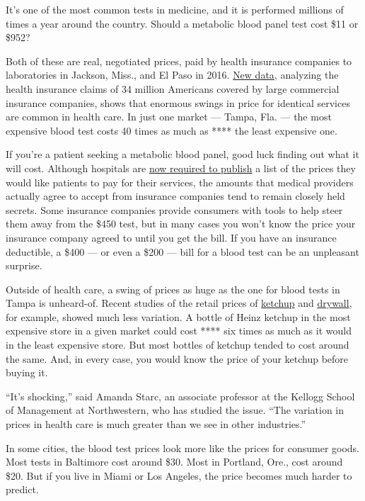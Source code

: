It's one of the most common tests in medicine, and it is performed
millions of times a year around the country. Should a metabolic blood
panel test cost \$11 or \$952?

Both of these are real, negotiated prices, paid by health insurance
companies to laboratories in Jackson, Miss., and El Paso in 2016.
\href{https://www.healthcostinstitute.org/blog/entry/hmi-2019-service-prices}{New
data}, analyzing the health insurance claims of 34 million Americans
covered by large commercial insurance companies, shows that enormous
swings in price for identical services are common in health care. In
just one market --- Tampa, Fla. --- the most expensive blood test costs
40 times as much as **** the least expensive one.

If you're a patient seeking a metabolic blood panel, good luck finding
out what it will cost. Although hospitals are
\href{https://www.nytimes3xbfgragh.onion/2019/01/13/us/politics/hospital-prices-online.html}{now
required to publish} a list of the prices they would like patients to
pay for their services, the amounts that medical providers actually
agree to accept from insurance companies tend to remain closely held
secrets. Some insurance companies provide consumers with tools to help
steer them away from the \$450 test, but in many cases you won't know
the price your insurance company agreed to until you get the bill. If
you have an insurance deductible, a \$400 --- or even a \$200 --- bill
for a blood test can be an unpleasant surprise.

Outside of health care, a swing of prices as huge as the one for blood
tests in Tampa is unheard-of. Recent studies of the retail prices of
\href{https://www.semanticscholar.org/paper/THE-MORPHOLOGY-OF-PRICE-DISPERSION-Kaplan/fe959cc8917c4843ef926a5c1fd5e480317a588e}{ketchup}
and
\href{https://pubs.aeaweb.org/doi/pdfplus/10.1257/mic.20170130}{drywall},
for example, showed much less variation. A bottle of Heinz ketchup in
the most expensive store in a given market could cost **** six times as
much as it would in the least expensive store. But most bottles of
ketchup tended to cost around the same. And, in every case, you would
know the price of your ketchup before buying it.

``It's shocking,'' said Amanda Starc, an associate professor at the
Kellogg School of Management at Northwestern, who has studied the issue.
``The variation in prices in health care is much greater than we see in
other industries.''

In some cities, the blood test prices look more like the prices for
consumer goods. Most tests in Baltimore cost around \$30. Most in
Portland, Ore., cost around \$20. But if you live in Miami or Los
Angeles, the price becomes much harder to predict.

